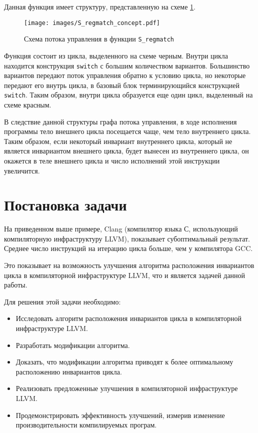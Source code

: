 Данная функция имеет структуру, представленную на схеме \ref{fig:S_regmatch_concept}.
\begin{figure}
    \centering
    \texttt{[image: images/S\_regmatch\_concept.pdf]}
    \caption{Схема потока управления в функции \texttt{S\_regmatch}}
    \label{fig:S_regmatch_concept}
\end{figure}

Функция состоит из цикла, выделенного на схеме черным.
Внутри цикла находится конструкция \texttt{switch} с большим количеством вариантов.
Большинство вариантов передают поток управления обратно к условию цикла, но некоторые передают его внутрь цикла, в базовый блок терминирующийся конструкцией \texttt{switch}.
Таким образом, внутри цикла образуется еще один цикл, выделенный на схеме красным.

В следствие данной структуры графа потока управления, в ходе исполнения программы тело внешнего цикла посещается чаще, чем тело внутреннего цикла.
Таким образом, если некоторый инвариант внутреннего цикла, который не является инвариантом внешнего цикла, будет вынесен из внутреннего цикла, он окажется в теле внешнего цикла и число исполнений этой инструкции увеличится.

\section*{Постановка задачи}

На приведенном выше примере, Clang (компилятор языка С, использующий компиляторную инфраструктуру LLVM), показывает субоптимальный результат.
Среднее число инструкций на итерацию цикла больше, чем у компилятора GCC.

Это показывает на возможность улучшения алгоритма расположения инвариантов цикла в компиляторной инфраструктуре LLVM, что и является задачей данной работы.

Для решения этой задачи необходимо:
\begin{itemize}
    \item Исследовать алгоритм расположения инвариантов цикла в компиляторной инфраструктуре LLVM.
    \item Разработать модификации алгоритма.
    \item Доказать, что модификации алгоритма приводят к более оптимальному расположению инвариантов цикла.
    \item Реализовать предложенные улучшения в компиляторной инфраструктуре LLVM.
    \item Продемонстрировать эффективность улучшений, измерив изменение производительности компилируемых програм.
\end{itemize}

\newpage
